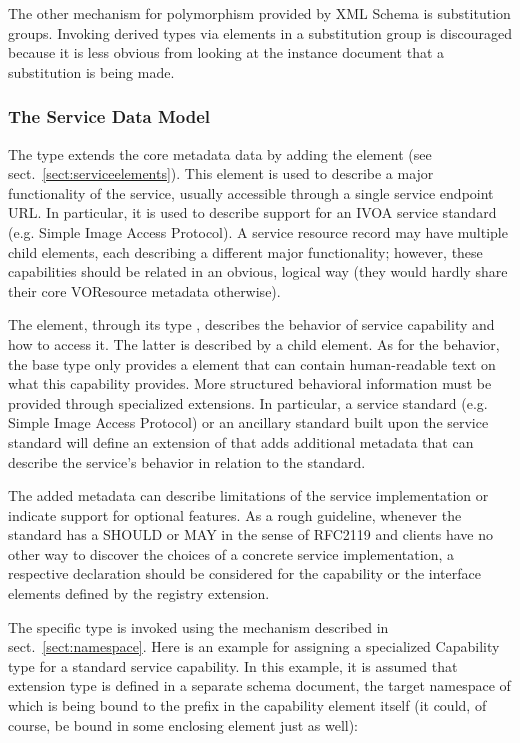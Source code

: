 \documentclass[11pt,a4paper]{ivoa}
\begin{document}
The other mechanism for polymorphism provided by XML Schema is
substitution groups.  Invoking derived  types via
elements in a substitution group is discouraged because it is less
obvious from looking at the instance document that a substitution is
being made.  


\subsubsection{The Service Data Model}
\label{sect:servicemodel}


The  type extends the core 
metadata data by adding the  element (see
sect.~\ref{sect:serviceelements}).  This element is used to describe a major
functionality of the service, usually accessible through a single
service endpoint URL.  In particular, it is used to describe support for
an IVOA service standard (e.g. Simple Image Access Protocol).  A service
resource record may have multiple child  elements,
each describing a different major functionality; however, these
capabilities should be related in an obvious, logical way (they would
hardly share their core VOResource metadata otherwise).

The  element, through its type ,
describes the behavior of service capability and how to access it.  The
latter is described by a child  element.  As for the
behavior, the base  type only provides a
 element that can contain human-readable text on what
this capability provides.  More structured behavioral information must
be provided through specialized  extensions.  In
particular, a service standard (e.g. Simple Image
Access Protocol) or an ancillary standard built upon the service
standard will define an extension of  that
adds additional metadata that can describe the service's behavior in
relation to the standard. 

The added metadata can describe
limitations of the service implementation or indicate support for
optional features.  As a rough guideline, whenever the standard has a
SHOULD or MAY in the sense of RFC2119 and clients have no other way to
discover the choices of a concrete service implementation, a respective
declaration should be considered for the capability or the interface
elements defined by the registry extension.

The specific  type is invoked
using the  mechanism described in
sect.~\ref{sect:namespace}.
Here is an example for assigning a specialized Capability type for
a standard service capability.  In this example, it is assumed that
 extension type is defined in a separate
schema document, the target namespace of which is being bound to the
 prefix in the capability element itself (it could, of
course, be bound in some enclosing element just as well):
\end{document}
